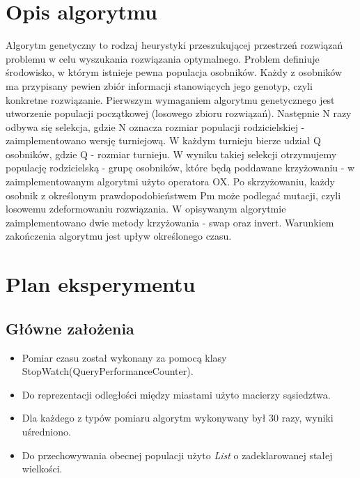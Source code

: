 \documentclass{article}
\begin{document}
\section{Opis algorytmu}
\par Algorytm genetyczny to rodzaj heurystyki przeszukującej przestrzeń  rozwiązań problemu w celu wyszukania rozwiązania optymalnego. Problem definiuje środowisko, w którym istnieje pewna populacja osobników. Każdy z osobników ma przypisany pewien zbiór informacji stanowiących jego genotyp, czyli konkretne rozwiązanie.
\newline
\newline
Pierwszym wymaganiem algorytmu genetycznego jest utworzenie populacji początkowej (losowego zbioru rozwiązań). Następnie N razy odbywa się selekcja, gdzie N oznacza rozmiar populacji rodzicielskiej - zaimplementowano wersję turniejową. W każdym turnieju bierze udział Q osobników, gdzie Q - rozmiar turnieju. W wyniku takiej selekcji otrzymujemy populację rodzicielską - grupę osobników, które będą poddawane krzyżowaniu - w zaimplementowanym algorytmi użyto operatora OX. Po skrzyżowaniu, każdy osobnik z określonym prawdopodobieństwem Pm może podlegać mutacji, czyli losowemu zdeformowaniu rozwiązania. W opisywanym algorytmie zaimplementowano dwie metody krzyżowania - swap oraz invert.
Warunkiem zakończenia algorytmu jest upływ określonego czasu.

\newpage
\section{Plan eksperymentu}
\subsection{Główne założenia}
\begin{itemize}
	\item Pomiar czasu został wykonany za pomocą klasy StopWatch(QueryPerformanceCounter).
	\item Do reprezentacji odległości między miastami użyto macierzy sąsiedztwa.
	\item Dla każdego z typów pomiaru algorytm wykonywany był 30 razy, wyniki uśredniono.
	\item Do przechowywania obecnej populacji użyto \textit{List} o zadeklarowanej stałej wielkości.
\end{itemize}
\end{document}
